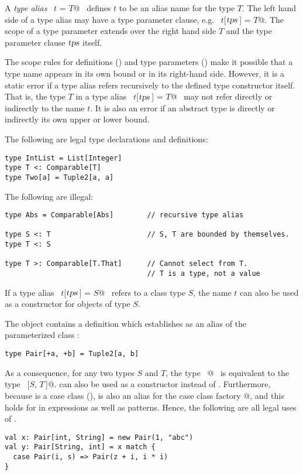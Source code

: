 A {\em type alias} ~\lstinline@type $t$ = $T$@~ defines $t$ to be an alias
name for the type $T$.  The left hand side of a type alias may
have a type parameter clause, e.g. ~\lstinline@type $t$[$\mbox{\sl tps}\,$] = $T$@.  The scope
of a type parameter extends over the right hand side $T$ and the
type parameter clause $\mbox{\sl tps}$ itself.  

The scope rules for definitions () and type parameters
() make it possible that a type name appears in its
own bound or in its right-hand side.  However, it is a static error if
a type alias refers recursively to the defined type constructor itself.  
That is, the type $T$ in a type alias ~\lstinline@type $t$[$\mbox{\sl tps}\,$] = $T$@~ may not refer
directly or indirectly to the name $t$.  It is also an error if
an abstract type is directly or indirectly its own upper or lower bound.

\example The following are legal type declarations and definitions:
\begin{lstlisting}
type IntList = List[Integer]
type T <: Comparable[T]
type Two[a] = Tuple2[a, a]
\end{lstlisting}

The following are illegal:
\begin{lstlisting}
type Abs = Comparable[Abs]        // recursive type alias

type S <: T                       // S, T are bounded by themselves.
type T <: S

type T >: Comparable[T.That]      // Cannot select from T.
                                  // T is a type, not a value
\end{lstlisting}

If a type alias ~\lstinline@type $t$[$\mbox{\sl tps}\,$] = $S$@~ refers to a class type
$S$, the name $t$ can also be used as a constructor for
objects of type $S$.

\example The  object contains a definition which establishes  
as an alias of the parameterized class :
\begin{lstlisting}
type Pair[+a, +b] = Tuple2[a, b] 
\end{lstlisting}
As a consequence, for any two types $S$ and $T$, the type
~\lstinline@Pair[$S$, $T\,$]@~ is equivalent to the type ~[$S$, $T\,$]@.
 can also be used as a constructor instead of .
Furthermore, because  is a case class (),
 is also an alias for the case class factory @, and this holds
for in expressions as well as patterns. Hence, the following are all legal uses of \lstinline@Pair@.
\begin{lstlisting}
val x: Pair[int, String] = new Pair(1, "abc")
val y: Pair[String, int] = x match {
  case Pair(i, s) => Pair(z + i, i * i)
}
\end{lstlisting}

